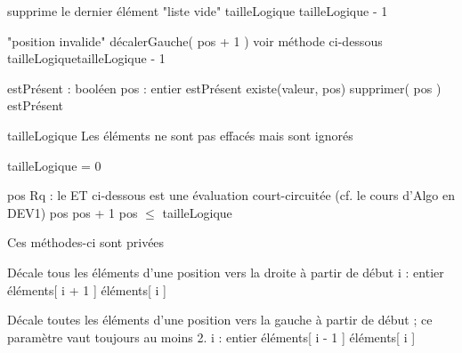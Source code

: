 \begin{Pseudocode}
		\LComment supprime le dernier élément
			\Error "liste vide"
		\EndIf
		\Let tailleLogique \Gets tailleLogique - 1
	\EndMethod
\end{Pseudocode}

\begin{Pseudocode}
			\Error "position invalide"
		\EndIf
		\Stmt décalerGauche( pos + 1 )
		\RComment voir méthode ci-dessous
		\Let tailleLogique\Gets tailleLogique - 1
	\EndMethod
\end{Pseudocode}

\begin{Pseudocode}
		\Decl estPrésent : booléen
		\Decl pos : entier
		\Let estPrésent \Gets existe(valeur, pos)
			\Stmt supprimer( pos )
		\EndIf
		\Return estPrésent
	\EndMethod
\end{Pseudocode}

\begin{Pseudocode}
		\Let tailleLogique  
		\RComment Les éléments ne sont pas effacés mais sont ignorés
	\EndMethod
\end{Pseudocode}

\begin{Pseudocode}
		\Return tailleLogique = 0
	\EndMethod
\end{Pseudocode}

\begin{Pseudocode}
		\Let pos 
		\LComment Rq : le ET ci-dessous est une évaluation 
		court-circuitée (cf. le cours d'Algo en DEV1)
			\Let pos \Gets pos + 1
		\EndWhile
		\Return pos {${\leq}$} tailleLogique
	\EndMethod
\end{Pseudocode}

\begin{Pseudocode}
	\LComment Ces méthodes-ci sont privées
	\bigskip

		\LComment Décale tous les éléments d'une position vers
		la droite à partir de début
		\Decl i : entier
			\Let éléments[ i + 1 ] \Gets éléments[ i ]
		\EndFor
	\EndMethod

	\bigskip
	
		\LComment Décale toutes les éléments d'une position vers
		la gauche à partir de début ; 
		\LComment ce paramètre vaut toujours au moins 2.
		\Decl i : entier
			\Let éléments[ i - 1 ] \Gets éléments[ i ]
		\EndFor
	\EndMethod
\end{Pseudocode}

